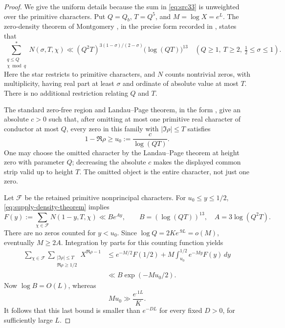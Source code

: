 \begin{proof}
We give the uniform details because the sum in
\eqref{eq:src33} is unweighted over the primitive characters.
Put \(Q=Q_b\), \(T=Q^5\), and \(M=\log X=e^L\).
The zero-density theorem of Montgomery
\cite[Theorem~1]{Montgomery1969}, in the precise form recorded in
\cite[Lemma~1]{Inoue}, states that
\begin{equation}\label{eq:supply-density-theorem}
 \sum_{\substack{q\le Q\\\chi\bmod q}}^{*}
       N(\sigma,T,\chi)
 \ll
 (Q^2T)^{3(1-\sigma)/(2-\sigma)}
       \bigl(\log(QT)\bigr)^{13}
 \quad
 \left(Q\ge1,\ T\ge2,\ \tfrac12\le\sigma\le1\right).
\end{equation}
Here the star restricts to primitive characters, and \(N\) counts
nontrivial zeros, with multiplicity, having real part at least
\(\sigma\) and ordinate of absolute value at most \(T\).
There is no additional restriction relating \(Q\) and \(T\).

 The standard zero-free region and Landau--Page theorem, in the
 form \cite[Lemma~7.1]{FordGreenKonyaginMaynardTao2018},
 give an absolute \(c>0\)
such that, after omitting at most one primitive real character of
conductor at most \(Q\), every zero in this family with
\(|\Im\rho|\le T\) satisfies
\[
 1-\Re\rho\ge u_0:=\frac{c}{\log(QT)}.
\]
One may choose the omitted character by the Landau--Page theorem
at height zero with parameter \(Q\); decreasing the absolute \(c\)
makes the displayed common strip valid up to height \(T\).
The omitted object is the entire character, not just one zero.

Let \(\mathcal F\) be the retained primitive nonprincipal characters.
For \(u_0\le y\le1/2\), \eqref{eq:supply-density-theorem} implies
\[
 F(y):=\sum_{\chi\in\mathcal F}N(1-y,T,\chi)
 \ll B e^{Ay},\qquad
 B=(\log(QT))^{13},\quad A=3\log(Q^2T).
\]
There are no zeros counted for \(y<u_0\).
Since \(\log Q=2K e^{.9L}=o(M)\), eventually \(M\ge2A\).
Integration by parts for this counting function yields
\begin{align*}
 \sum_{\chi\in\mathcal F}
 \sum_{\substack{|\Im\rho|\le T\\\Re\rho\ge1/2}}
       X^{\Re\rho-1}
 &\le e^{-M/2}F(1/2)
       +M\int_{u_0}^{1/2}e^{-My}F(y)\,dy\\
 &\ll B\exp(-Mu_0/2).
\end{align*}
Now \(\log B=O(L)\), whereas
\[
 Mu_0\gg\frac{e^{.1L}}K.
\]
It follows that this last bound is smaller than \(e^{-DL}\)
for every fixed \(D>0\), for sufficiently large \(L\).


\end{proof}
